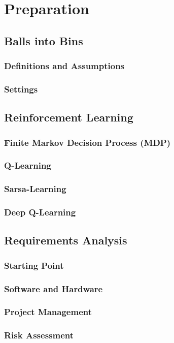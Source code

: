 \chapter{Preparation}\label{preparation}

\ifpdf
    \graphicspath{{Chapter2/Figs/Raster/}{Chapter2/Figs/PDF/}{Chapter2/Figs/}}
\else
    \graphicspath{{Chapter2/Figs/Vector/}{Chapter2/Figs/}}
\fi



\section{Balls into Bins}


\subsection{Definitions and Assumptions}


\subsection{Settings}



\section{Reinforcement Learning}


\subsection{Finite Markov Decision Process (MDP)}


\subsection{Q-Learning}


\subsection{Sarsa-Learning}


\subsection{Deep Q-Learning}


\section{Requirements Analysis}


\subsection{Starting Point}


\subsection{Software and Hardware}


\subsection{Project Management}


\subsection{Risk Assessment}